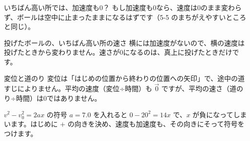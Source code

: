 \begin{tsumazuki}{いちばん高い所では、加速度も0？}
もし加速度も0なら、速度は0のまま変わらず、ボールは空中に止まったままになるはずです（5-5 のまちがえやすいところと同じ）。
\end{tsumazuki}

\begin{tsumazuki}{投げたボールの、いちばん高い所の速さ}
横には加速度がないので、横の速度は投げたときから変わりません。速さが0になるのは、真上に投げたときだけです。
\end{tsumazuki}

\begin{tsumazuki}{変位と道のり}
変位は「はじめの位置から終わりの位置への矢印」で、途中の道すじによりません。平均の速度（変位÷時間）も $\vec 0$ ですが、平均の速さ（道のり÷時間）は0ではありません。
\end{tsumazuki}

\begin{tsumazuki}{$v^2-v_0^2=2ax$ の符号}
$a=7.0$ を入れると $0-20^2=14x$ で、$x$ が負になってしまいます。はじめに $+$ の向きを決め、速度も加速度も、その向きにそって符号をつけます。
\end{tsumazuki}


